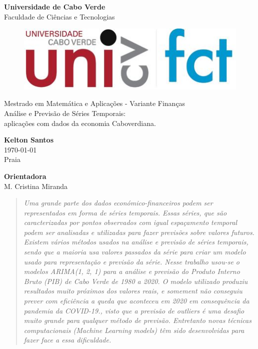 \begin{titlepage}
\begin{center}
\LARGE{\textbf{Universidade de Cabo Verde}}\\
\normalsize{Faculdade de Ciências e Tecnologias}\\[0.3cm]

\begin{figure}[h!]
    \centering
    \includegraphics[width=.3\linewidth]{img/hpi_logo.jpg}
\end{figure}
\vspace{4cm}

\LARGE{Mestrado em Matemática e Aplicações - Variante Finanças}\\[0.7cm]
\Huge{Análise e Previsão de Séries Temporais:\\ aplicações com dados da economia Caboverdiana.}

\vspace{3cm} 

\Large{\textbf{Kelton Santos}} \\[3pt]  
\vspace{0.5cm}
\large{\today} \\
Praia

\vspace{1cm}

\large{\textbf{Orientadora}}\\
M. Cristina Miranda\\
\vspace{0.5cm}
\end{center}
\end{titlepage}


\thispagestyle{empty}


\begin{abstract}
\justify 
\emph{Uma grande parte dos dados económico-financeiros podem ser representados em forma de séries temporais. Essas séries, que são caracterizadas por pontos observados com igual espaçamento temporal podem ser analisadas e utilizadas para fazer previsões sobre valores futuros. Existem vários métodos usados na análise e previsão de séries temporais, sendo que a maioria usa valores passados da série para criar um modelo usado para representação e previsão da série. Nesse trabalho usou-se o modelos ARIMA(1, 2, 1) para a análise e previsão do Produto Interno Bruto (PIB) de Cabo Verde de 1980 a 2020. O modelo utilizado produziu resultados muito próximos dos valores reais, e somement não conseguiu prever com eficiência a queda que aconteceu em 2020 em consequência da pandemia da COVID-19., visto que a  previsão de outliers é uma desafio muito grande para qualquer método de previsão. Entretanto novas técnicas computacionais (Machine Learning models) têm sido desenvolvidas para fazer face a essa dificuldade.}
\end{abstract}

% 
% 

\setcounter{page}{1}
